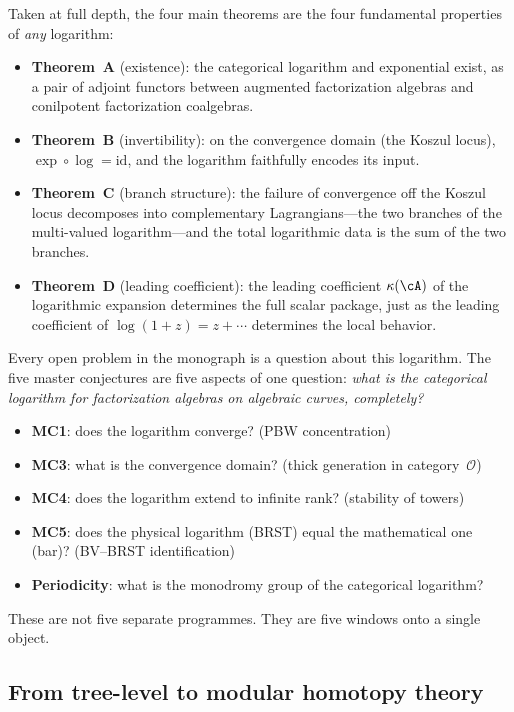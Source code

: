 Taken at full depth, the four main theorems are the four fundamental
properties of \emph{any} logarithm:
\begin{itemize}
\item \textbf{Theorem~A} (existence): the categorical logarithm and
exponential exist, as a pair of adjoint functors between augmented
factorization algebras and conilpotent factorization coalgebras.
\item \textbf{Theorem~B} (invertibility): on the convergence domain
(the Koszul locus), $\exp \circ \log = \mathrm{id}$, and the
logarithm faithfully encodes its input.
\item \textbf{Theorem~C} (branch structure): the failure of
convergence off the Koszul locus decomposes into complementary
Lagrangians---the two branches of the multi-valued logarithm---and the
total logarithmic data is the sum of the two branches.
\item \textbf{Theorem~D} (leading coefficient): the leading
coefficient $\kappa(\cA)$ of the logarithmic expansion determines the
full scalar package, just as the leading coefficient of
$\log(1+z) = z + \cdots$ determines the local behavior.
\end{itemize}

Every open problem in the monograph is a question about this
logarithm.  The five master conjectures are five aspects of one
question: \emph{what is the categorical logarithm for factorization
algebras on algebraic curves, completely?}
\begin{itemize}
\item \textbf{MC1}: does the logarithm converge? (PBW concentration)
\item \textbf{MC3}: what is the convergence domain? (thick generation
in category~$\mathcal{O}$)
\item \textbf{MC4}: does the logarithm extend to infinite rank?
(stability of towers)
\item \textbf{MC5}: does the physical logarithm (BRST) equal the
mathematical one (bar)? (BV--BRST identification)
\item \textbf{Periodicity}: what is the monodromy group of the
categorical logarithm?
\end{itemize}
These are not five separate programmes.  They are five windows onto a
single object.

\subsection{From tree-level to modular homotopy theory}
\label{subsec:tree-to-modular}

